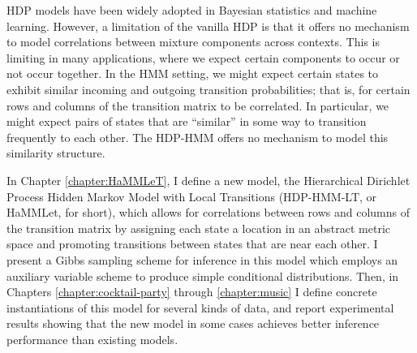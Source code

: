 HDP models have been widely adopted in Bayesian statistics and
machine learning.  However, a limitation of the vanilla HDP
is that it offers no mechanism to model correlations between mixture
components across contexts.  %
This is limiting in many applications, where we expect certain 
components to occur or not occur together.  In the HMM setting, 
we might expect certain states to exhibit similar incoming and
outgoing transition probabilities; that is, for certain rows and columns of the transition
matrix to be correlated.  In particular, we might expect pairs of states that are
``similar'' in some way to transition frequently to each other.  The
HDP-HMM offers no mechanism to model this similarity structure.  

In Chapter \ref{chapter:HaMMLeT}, I define a new model, the Hierarchical Dirichlet
Process Hidden Markov Model with Local Transitions (HDP-HMM-LT, or
HaMMLet, for short), which allows for correlations between rows and columns of the
transition matrix by assigning each state a location in an abstract metric 
space and promoting transitions between states
that are near each other.  I present a Gibbs sampling scheme
for inference in this model which employs an auxiliary variable scheme
to produce simple conditional distributions.  Then, in Chapters
\ref{chapter:cocktail-party} through \ref{chapter:music} I define
concrete instantiations of this model for several kinds of data, and
report experimental results showing that the new model in some cases
achieves better inference performance than existing models.



